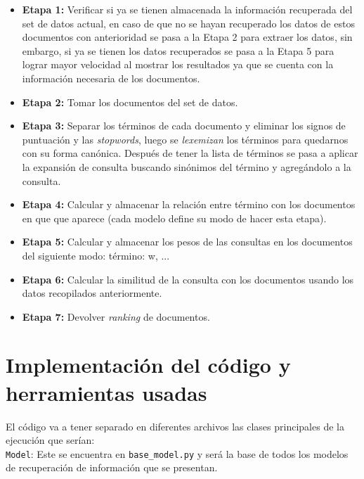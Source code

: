 \documentclass[spanish]{article}
\begin{document}
			\begin{itemize}
				\item \textbf{Etapa 1:} Verificar si ya se tienen almacenada la información recuperada del set de datos actual, en caso de que no se hayan recuperado los datos de estos documentos con anterioridad se pasa a la Etapa 2 para extraer los datos, sin embargo, si ya se tienen los datos recuperados se pasa a la Etapa 5 para lograr mayor velocidad al mostrar los resultados ya que se cuenta con la información necesaria de los documentos.

				\item \textbf{Etapa 2:} Tomar los documentos del set de datos.

				\item \textbf{Etapa 3:}  Separar los términos de cada documento y eliminar los signos de puntuación y las \emph{stopwords}, luego se \emph{lexemizan} los términos para quedarnos con su forma canónica. Después de tener la lista de términos se pasa a aplicar la expansión de consulta buscando sinónimos del término y agregándolo a la consulta.

				\item \textbf{Etapa 4:} Calcular y almacenar la relación entre término con los documentos en que que aparece (cada modelo define su modo de hacer esta etapa).

				\item \textbf{Etapa 5:} Calcular y almacenar los pesos de las consultas en los documentos del siguiente modo: {término: w, ...}

				\item \textbf{Etapa 6:} Calcular la similitud de la consulta con los documentos usando los datos recopilados anteriormente.

				\item \textbf{Etapa 7:} Devolver \emph{ranking} de documentos.

			\end{itemize}	

	\section*{Implementación del código y herramientas usadas}
		
		
		El código va a tener separado en diferentes archivos las clases principales de la ejecución que serían:\\

		\texttt{Model}: Este se encuentra en \texttt{base\_model.py} y será la base de todos los modelos de recuperación de información que se presentan.\\
\end{document}
